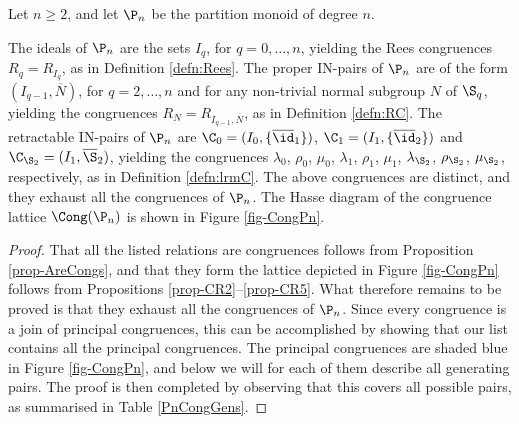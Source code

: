 
\begin{thm}\label{thm-CongPn}
Let $n\geq2$, and let $\P_n$ be the partition monoid of degree $n$.  
\begin{itemize}
 The ideals of $\P_n$ are the sets $I_q$, for $q=0,\ldots,n$, yielding the Rees congruences $R_q=R_{I_q}$, as in Definition \ref{defn:Rees}.
 The proper IN-pairs of $\P_n$ are of the form $(I_{q-1},\overline N)$, for $q=2,\ldots,n$ and for any non-trivial normal subgroup $N$ of $\S_q$, yielding the congruences $R_N=R_{I_{q-1},\overline N}$, as in Definition \ref{defn:RC}.
 The retractable IN-pairs of $\P_n$ are $\C_0=(I_0,\{\overline{\id}_1\})$, $\C_1=(I_1,\{\overline{\id}_2\})$ and $\C_{\S_2}=(I_1,\overline{\S}_2)$, yielding the congruences $\lambda_0$, $\rho_0$, $\mu_0$, $\lambda_1$, $\rho_1$, $\mu_1$, $\lambda_{\S_2}$, $\rho_{\S_2}$, $\mu_{\S_2}$, respectively, as in Definition \ref{defn:lrmC}.
 The above congruences are distinct, and they exhaust all the congruences of $\P_n$.
 The Hasse diagram of the congruence lattice $\Cong(\P_n) $ is shown in Figure \ref{fig-CongPn}.
\end{itemize}
\end{thm}


\begin{proof}
That all the listed relations are congruences follows from Proposition \ref{prop-AreCongs}, and that they form the lattice depicted in Figure \ref{fig-CongPn} follows from Propositions \ref{prop-CR2}--\ref{prop-CR5}.
What therefore remains to be proved is that they exhaust all the congruences of $\P_n$.
Since every congruence is a join of principal congruences, this can be accomplished by showing that our list contains all the principal congruences. 
The principal congruences are shaded blue in Figure \ref{fig-CongPn}, and below we will for each of them describe all generating pairs. 
The proof is then completed by observing that this covers all possible pairs, as summarised in Table \ref{PnCongGens}.
\end{proof}



